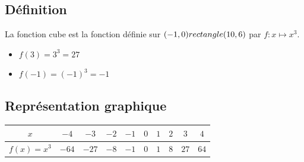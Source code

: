 \subsection{Définition}
  \begin{minipage}[c]{0.6\linewidth}
\begin{Définition}
La fonction cube est la fonction définie sur $(-1,0) rectangle (10,6)$ par $f:x\mapsto x^3$.
\end{Définition}
  \end{minipage} \hfill
  \begin{minipage}[c]{0.33\linewidth}
  \begin{Exemple}
  \leavevmode\vspace{-\baselineskip}
\begin{itemize}[label=\textcolor{Couleur8}{$\bullet$}]
\item $f(3)=3^3=27$ 
\item $f(-1)=(-1)^3=-1$
\end{itemize}
\end{Exemple}
  \end{minipage}


\subsection{Représentation graphique}
\begin{center}

\begin{tabular}{|c|c|c|c|c|c|c|c|c|c|}
\arrayrulecolor{Couleur6} \hline
$x$ & $-4$ & $-3$ & $-2$ & $-1$ & $0$ & $1$ & $2$ & $3$ & $4$\\
\hline
$f(x)=x^3$ & $-64$ & $-27$ & $-8$ & $-1$ & $0$ & $1$ & $8$ & $27$ & $64$\\
\hline

\end{tabular}
\end{center}

